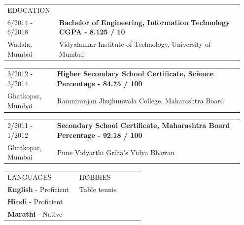 \documentclass{letter}
\begin{document}
\vspace{15pt}
\begin{tabular}{p{0.2\linewidth} p{0.75\linewidth}}
  \normalsize\colorbox{black!100}{\textcolor{white!90}{EDUCATION}} \\[1ex] 
  6/2014 - 6/2018 & \normalsize\textbf{Bachelor of Engineering, Information Technology} \hfill \footnotesize\textbf{CGPA - 8.125 / 10} \\
  \small Wadala, Mumbai & Vidyalankar Institute of Technology, University of Mumbai \\
\end{tabular}

\begin{tabular}{p{0.2\linewidth} p{0.75\linewidth}}
  3/2012 - 3/2014 & \normalsize\textbf{Higher Secondary School Certificate, Science} \hfill \footnotesize\textbf{Percentage - 84.75 / 100} \\
  \small Ghatkopar, Mumbai & Ramniranjan Jhujhunwala College, Maharashtra Board \\
\end{tabular}

\begin{tabular}{p{0.2\linewidth} p{0.75\linewidth}}
  2/2011 - 1/2012 & \normalsize\textbf{Secondary School Certificate, Maharashtra Board} \hfill \footnotesize\textbf{Percentage - 92.18 / 100} \\
  \small Ghatkopar, Mumbai & Pune Vidyarthi Griha's Vidya Bhawan \\
\end{tabular}

\vspace{15pt}
\begin{tabular}{p{0.5\linewidth} p{0.45\linewidth}}
  \normalsize\colorbox{black!100}{\textcolor{white!90}{LANGUAGES}} & 
  \normalsize\colorbox{black!100}{\textcolor{white!90}{HOBBIES}} \\[1ex] 

  \textbf{English} - Proficient & Table tennis \\
  \textbf{Hindi} - Proficient \\ 
  \textbf{Marathi} - Native \\
\end{tabular}
\end{document}
